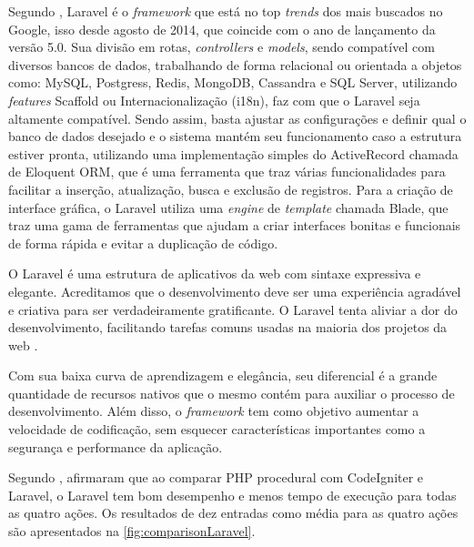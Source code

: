 Segundo , Laravel é o \textit{framework} que está no top \textit{trends} dos mais buscados no Google, isso desde agosto de 2014, que coincide com o ano de lançamento da versão 5.0. Sua divisão em rotas, \textit{controllers} e \textit{models}, sendo compatível com diversos bancos de dados, trabalhando de forma relacional ou orientada a objetos como: MySQL, Postgress, Redis, MongoDB, Cassandra e SQL Server, utilizando \textit{features} Scaffold ou Internacionalização (i18n), faz com que o Laravel seja altamente compatível. Sendo assim, basta ajustar as configurações e definir qual o banco de dados desejado e o sistema mantém seu funcionamento caso a estrutura estiver pronta, utilizando uma implementação simples do ActiveRecord chamada de Eloquent ORM, que é uma ferramenta que traz várias funcionalidades para facilitar a inserção, atualização, busca e exclusão de registros. Para a criação de interface gráfica, o Laravel utiliza uma \textit{engine} de \textit{template} chamada Blade, que traz uma gama de ferramentas que ajudam a criar interfaces bonitas e funcionais de forma rápida e evitar a duplicação de código.

\begin{citacao}
 O Laravel é uma estrutura de aplicativos da web com sintaxe expressiva e elegante. Acreditamos que o desenvolvimento deve ser uma experiência agradável e criativa para ser verdadeiramente gratificante. O Laravel tenta aliviar a dor do desenvolvimento, facilitando tarefas comuns usadas na maioria dos projetos da web \cite{laravel}.
\end{citacao}


Com sua baixa curva de aprendizagem e elegância, seu diferencial é a grande quantidade de recursos nativos que o mesmo contém para auxiliar o processo de desenvolvimento. Além disso, o \textit{framework} tem como objetivo aumentar a velocidade de codificação, sem esquecer características importantes como a segurança e performance da aplicação.

Segundo , afirmaram que ao comparar PHP procedural com CodeIgniter e Laravel, o Laravel tem bom desempenho e menos tempo de execução para todas as quatro ações. Os resultados de dez entradas como média para as quatro ações são apresentados na \autoref{fig:comparisonLaravel}.

